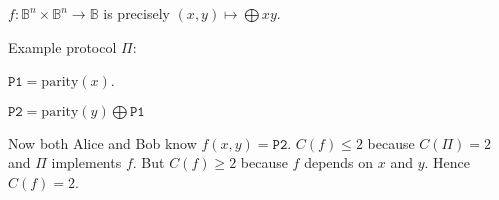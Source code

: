 \begin{example}
\(f : \mathbb{B}^n \times \mathbb{B}^n \to \mathbb{B}\)
is precisely
\((x, y) \mapsto \bigoplus xy\).
\end{example}
\pause
Example protocol $\Pi$:
\begin{leftbubbles}
{\footnotesize $\texttt{P1}=\text{parity}(x)$.}
\end{leftbubbles}
\pause
\begin{rightbubbles}
{\footnotesize $\texttt{P2}=\text{parity}(y) \bigoplus \texttt{P1}$}
\end{rightbubbles}
\pause
Now both Alice and Bob know $f(x, y) = \texttt{P2}$.
$C(f) \leq 2$ because $C(\Pi) = 2$ and $\Pi$ implements $f$.
But $C(f) \geq 2$ because $f$ depends on $x$ and $y$.
Hence \(C(f) = 2\).
